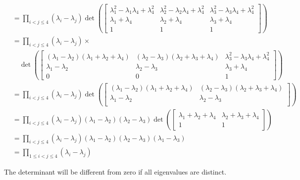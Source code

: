\begin{align*}
 &=\prod_{i<j\leq4} (\lambda_i - \lambda_j) \det\left( \begin{bmatrix}
             \lambda_1^2-\lambda_1\lambda_4 + \lambda_4^2 & \lambda_2^2-\lambda_2\lambda_4 + \lambda_4^2 &\lambda_3^2-\lambda_3\lambda_4 + \lambda_4^2\\
             \lambda_1+\lambda_4 & \lambda_2+\lambda_4 & \lambda_3+\lambda_4 \\
             1 & 1 & 1
            \end{bmatrix}
 \right)\\
 &=\prod_{i<j\leq4} (\lambda_i - \lambda_j) \times\\
 & \quad \det\left( \begin{bmatrix}
             (\lambda_1 - \lambda_2)(\lambda_1+\lambda_2+\lambda_4) &
             (\lambda_2 - \lambda_3)(\lambda_2+\lambda_3+\lambda_4) &
             \lambda_3^2-\lambda_3\lambda_4 + \lambda_4^2\\
             \lambda_1 - \lambda_2 & \lambda_2 - \lambda_3 & \lambda_3+\lambda_4\\
             0 & 0 & 1
            \end{bmatrix}
 \right)\\
  &=\prod_{i<j\leq4} (\lambda_i - \lambda_j)
 \det\left( \begin{bmatrix}
             (\lambda_1 - \lambda_2)(\lambda_1+\lambda_2+\lambda_4) &
             (\lambda_2 - \lambda_3)(\lambda_2+\lambda_3+\lambda_4) \\
             \lambda_1 - \lambda_2 & \lambda_2 - \lambda_3\\
            \end{bmatrix}
 \right)\\
 &=\prod_{i<j\leq4} (\lambda_i - \lambda_j)(\lambda_1-\lambda_2) (\lambda_2-\lambda_3)
 \det\left( \begin{bmatrix}
             \lambda_1+\lambda_2+\lambda_4 &
             \lambda_2+\lambda_3+\lambda_4 \\
             1 & 1
            \end{bmatrix}
 \right)\\
 &=\prod_{i<j\leq4} (\lambda_i - \lambda_j)(\lambda_1-\lambda_2) (\lambda_2-\lambda_3)(\lambda_1-\lambda_3)\\
 &=\prod_{1\leq i<j\leq4} (\lambda_i - \lambda_j)
\end{align*}

The determinant will be different from zero if all eigenvalues are distinct.


